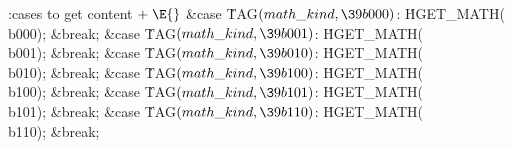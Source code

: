 
\getcode
\Y\B\4:cases to get content\X${}\mathrel+\E{}$\6
\4\&{case} \.{TAG}${}(\index{math kind+\\{math\_kind}}\\{math\_kind},\39\\{b000}){}$:\5
\.{HGET\_MATH}(\\{b000});\5
\&{break};\6
\4\&{case} \.{TAG}${}(\index{math kind+\\{math\_kind}}\\{math\_kind},\39\\{b001}){}$:\5
\.{HGET\_MATH}(\\{b001});\5
\&{break};\6
\4\&{case} \.{TAG}${}(\index{math kind+\\{math\_kind}}\\{math\_kind},\39\\{b010}){}$:\5
\.{HGET\_MATH}(\\{b010});\5
\&{break};\6
\4\&{case} \.{TAG}${}(\index{math kind+\\{math\_kind}}\\{math\_kind},\39\\{b100}){}$:\5
\.{HGET\_MATH}(\\{b100});\5
\&{break};\6
\4\&{case} \.{TAG}${}(\index{math kind+\\{math\_kind}}\\{math\_kind},\39\\{b101}){}$:\5
\.{HGET\_MATH}(\\{b101});\5
\&{break};\6
\4\&{case} \.{TAG}${}(\index{math kind+\\{math\_kind}}\\{math\_kind},\39\\{b110}){}$:\5
\.{HGET\_MATH}(\\{b110});\5
\&{break};
\Y
\fi


